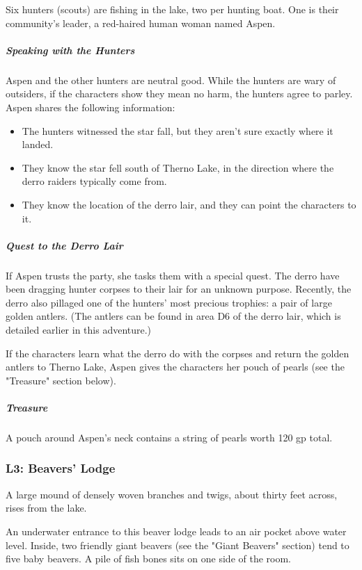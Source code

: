 \documentclass[10pt,a4paper,twoside,bg=print,twocolumn,openany,nodeprecatedcode]{dndbook}
\begin{document}
Six hunters (scouts) are fishing in the lake, two per hunting boat. One is their community's leader, a red-haired human woman named Aspen.

\subparagraph{Speaking with the Hunters}
Aspen and the other hunters are neutral good. While the hunters are wary of outsiders, if the characters show they mean no harm, the hunters agree to parley. Aspen shares the following information:


\begin{itemize}
\item The hunters witnessed the star fall, but they aren't sure exactly where it landed.
\item They know the star fell south of Therno Lake, in the direction where the derro raiders typically come from.
\item They know the location of the derro lair, and they can point the characters to it.
\end{itemize}

\subparagraph{Quest to the Derro Lair}
If Aspen trusts the party, she tasks them with a special quest. The derro have been dragging hunter corpses to their lair for an unknown purpose. Recently, the derro also pillaged one of the hunters' most precious trophies: a pair of large golden antlers. (The antlers can be found in area D6 of the derro lair, which is detailed earlier in this adventure.)

If the characters learn what the derro do with the corpses and return the golden antlers to Therno Lake, Aspen gives the characters her pouch of pearls (see the "Treasure" section below).

\subparagraph{Treasure}
A pouch around Aspen's neck contains a string of pearls worth 120 gp total.

\subsubsection{L3: Beavers' Lodge}
\begin{DndReadAloud}{}
A large mound of densely woven branches and twigs, about thirty feet across, rises from the lake.

\end{DndReadAloud}

An underwater entrance to this beaver lodge leads to an air pocket above water level. Inside, two friendly giant beavers (see the "Giant Beavers" section) tend to five baby beavers. A pile of fish bones sits on one side of the room.
\end{document}
